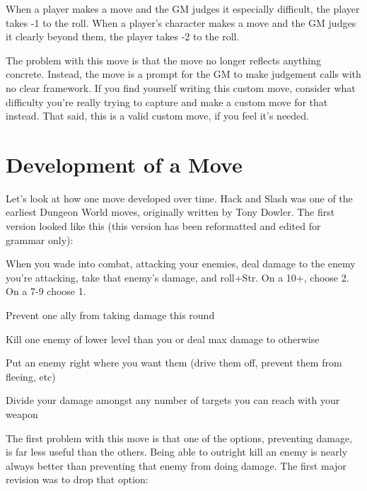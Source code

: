        
\startExample
When a player makes a move and the GM judges it especially difficult, the player takes -1 to the roll. When a player's character makes a move and the GM judges it clearly beyond them, the player takes -2 to the roll.
\stopExample
       

The problem with this move is that the move no longer reflects anything concrete. Instead, the move is a prompt for the GM to make judgement calls with no clear framework. If you find yourself writing this custom move, consider what difficulty you're really trying to capture and make a custom move for that instead. That said, this is a valid custom move, if you feel it's needed.

       
\section{Development of a Move}    
       

Let's look at how one move developed over time. Hack and Slash was one of the earliest Dungeon World moves, originally written by Tony Dowler. The first version looked like this (this version has been reformatted and edited for grammar only):

       
\startExample
When you wade into combat, attacking your enemies, deal damage to the enemy you’re attacking, take that enemy’s damage, and roll+Str. On a 10+, choose 2. On a 7-9 choose 1.
\stopExample
       
\startitemize[1,packed]
         
\item Prevent one ally from taking damage this round

         
\item Kill one enemy of lower level than you or deal max damage to otherwise

         
\item Put an enemy right where you want them (drive them off, prevent them from fleeing, etc)

         
\item Divide your damage amongst any number of targets you can reach with your weapon

       
\stopitemize
       

The first problem with this move is that one of the options, preventing damage, is far less useful than the others. Being able to outright kill an enemy is nearly always better than preventing that enemy from doing damage. The first major revision was to drop that option:

